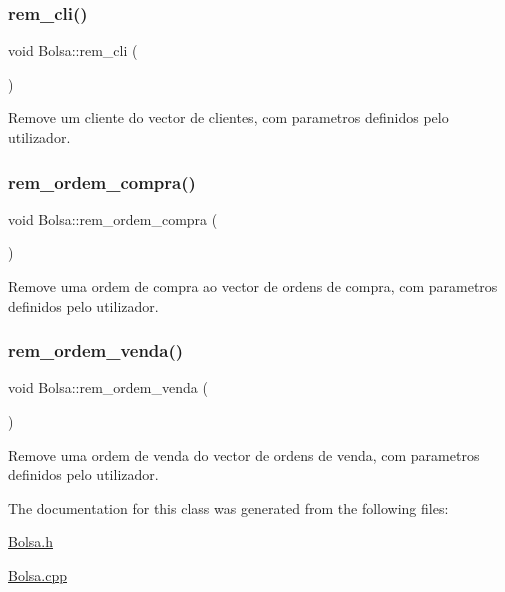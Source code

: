 \hypertarget{class_bolsa_a3fe70cc3887113b99e09457a62d3fb83}{}\label{class_bolsa_a3fe70cc3887113b99e09457a62d3fb83} 
\subsubsection{\texorpdfstring{rem\+\_\+cli()}{rem\_cli()}}
{\footnotesize\ttfamily void Bolsa\+::rem\+\_\+cli (\begin{DoxyParamCaption}{ }\end{DoxyParamCaption})}



Remove um cliente do vector de clientes, com parametros definidos pelo utilizador. 

\hypertarget{class_bolsa_a831836b62c66324d7eaf4c71a4e8015e}{}\label{class_bolsa_a831836b62c66324d7eaf4c71a4e8015e} 
\subsubsection{\texorpdfstring{rem\+\_\+ordem\+\_\+compra()}{rem\_ordem\_compra()}}
{\footnotesize\ttfamily void Bolsa\+::rem\+\_\+ordem\+\_\+compra (\begin{DoxyParamCaption}{ }\end{DoxyParamCaption})}



Remove uma ordem de compra ao vector de ordens de compra, com parametros definidos pelo utilizador. 

\hypertarget{class_bolsa_a293578d28d9de84f85844025b47fc505}{}\label{class_bolsa_a293578d28d9de84f85844025b47fc505} 
\subsubsection{\texorpdfstring{rem\+\_\+ordem\+\_\+venda()}{rem\_ordem\_venda()}}
{\footnotesize\ttfamily void Bolsa\+::rem\+\_\+ordem\+\_\+venda (\begin{DoxyParamCaption}{ }\end{DoxyParamCaption})}



Remove uma ordem de venda do vector de ordens de venda, com parametros definidos pelo utilizador. 



The documentation for this class was generated from the following files\+:\begin{DoxyCompactItemize}
\item 
\hyperlink{_bolsa_8h}{Bolsa.\+h}\item 
\hyperlink{_bolsa_8cpp}{Bolsa.\+cpp}\end{DoxyCompactItemize}
